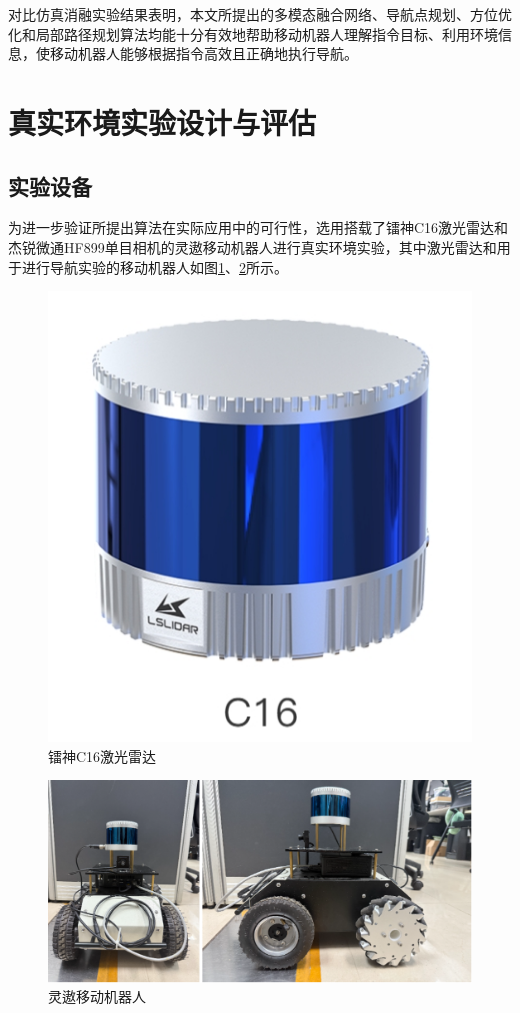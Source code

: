 对比仿真消融实验结果表明，本文所提出的多模态融合网络、导航点规划、方位优化和局部路径规划算法均能十分有效地帮助移动机器人理解指令目标、利用环境信息，使移动机器人能够根据指令高效且正确地执行导航。









\section{真实环境实验设计与评估}
\subsection{实验设备}%
为进一步验证所提出算法在实际应用中的可行性，选用搭载了镭神C16激光雷达和杰锐微通HF899单目相机的灵遨移动机器人进行真实环境实验，其中激光雷达和用于进行导航实验的移动机器人如图\ref{C16laser}、\ref{mycar}所示。

\begin{figure}[h]
    \centering
    \includegraphics[scale=0.3]{Fig/C16laser.png}
    \caption{\label{C16laser}镭神C16激光雷达}
\end{figure}

\begin{figure}[htbp]
    \centering
    \includegraphics[scale=0.17]{Fig/robot.png}
    \caption{\label{mycar}灵遨移动机器人}
\end{figure}

